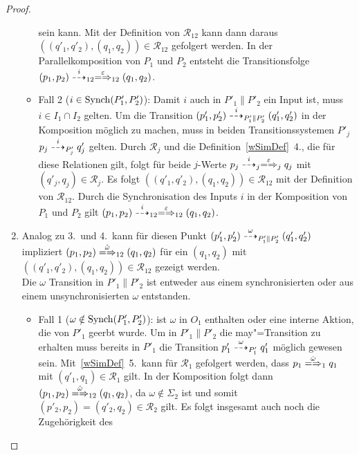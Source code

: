 \begin{proof}
\begin{enumerate}
\begin{itemize}
          sein kann. Mit der Definition von $\mathcal{R}_{12}$ kann dann daraus
          $((q'_1,q'_2),(q_1,q_2)) \in \mathcal{R}_{12}$ gefolgert werden. In
          der Parallelkomposition von $P_1$ und $P_2$ entsteht die
          Transitionsfolge $(p_1,p_2)\may[i]_{12} \weakmay[\varepsilon]_{12}
          (q_1,q_2)$.
        \item Fall 2 ($i\in\mathrm{Synch} (P'_1,P'_2)$): Damit $i$ auch in
          $P'_1\|P'_2$ ein Input ist, muss $i\in I_1\cap I_2$ gelten. Um die
          Transition $(p'_1,p'_2)\may[i]_{P'_1\|P'_2}(q'_1,q'_2)$ in der
          Komposition möglich zu machen, muss in beiden Transitionssystemen
          $P'_j$ $p_j \may[i]_{P'_j} q'_j$ gelten. Durch $\mathcal{R}_j$ und
          die Definition~\ref{wSimDef}~4., die für diese Relationen gilt, folgt
          für beide $j$-Werte $p_j\may[i]_j \weakmay[\varepsilon]_j q_j$ mit
          $(q'_j,q_j)\in\mathcal{R}_j$. Es folgt $((q'_1,q'_2),(q_1,q_2)) \in
          \mathcal{R}_{12}$ mit der Definition von $\mathcal{R}_{12}$. Durch
          die Synchronisation des Inputs $i$ in der Komposition von $P_1$ und
          $P_2$ gilt $(p_1,p_2) \may[i]_{12} \weakmay[\varepsilon]_{12}
          (q_1,q_2)$.
      \end{itemize}
    \item Analog zu 3.\ und 4.\ kann für diesen Punkt $(p'_1,p'_2)
      \may[\omega]_{P'_1\|P'_2} (q'_1,q'_2)$ impliziert $(p_1,p_2)
      \weakmay[\hat{\omega}]_{12} (q_1,q_2)$ für ein $(q_1,q_2)$ mit
      $((q'_1,q'_2),(q_1,q_2))\in\mathcal{R}_{12}$ gezeigt werden.\\
      Die $\omega$ Transition in $P'_1\|P'_2$ ist entweder aus einem
      synchronisierten oder aus einem unsynchronisierten $\omega$ entstanden.
      \begin{itemize}
        \item Fall 1 ($\omega\notin\mathrm{Synch} (P'_1,P'_2)$): \OBdA{} ist $\omega$
          in $O_1$ enthalten oder eine interne Aktion, die von $P'_1$ geerbt
          wurde. Um in $P'_1\|P'_2$ die may"=Transition zu erhalten muss
          bereits in $P'_1$ die Transition $p'_1 \may[\omega]_{P'_1} q'_1$
          möglich gewesen sein. Mit~\ref{wSimDef}~5.\ kann für $\mathcal{R}_1$
          gefolgert werden, dass $p_1 \weakmay[\hat{\omega}]_1 q_1$ mit
          $(q'_1,q_1) \in \mathcal{R}_1$ gilt. In der Komposition folgt dann
          $(p_1,p_2) \weakmay[\hat{\omega}]_{12} (q_1,q_2)$, da $\omega\notin
          \Sigma _2$ ist und somit $(p'_2,p_2)=(q'_2,q_2)\in\mathcal{R}_2$
          gilt. Es folgt insgesamt auch noch die Zugehörigkeit des

\end{itemize}
\end{enumerate}
\end{proof}
